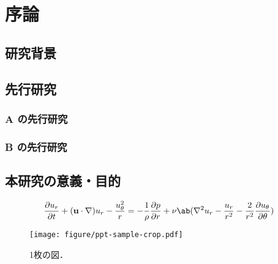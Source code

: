 
\chapter{序論}
\label{ch:introduction}


\section{研究背景}
\label{sec:background}


\section{先行研究}
\label{sec:previous}

\subsection{A の先行研究}
\label{ssec:previous_A}

\subsection{B の先行研究}
\label{ssec:previous_B}


\section{本研究の意義・目的}
\label{sec:objective}

\begin{equation}
    \pdv{u_r}{t} + (\mathbf{u}\cdot\nabla)u_r - \frac{u_\theta^2}{r} = 
    -\frac{1}{\rho}\pdv{p}{r} + \nu\ab(\nabla^2 u_r - \frac{u_r}{r^2} - \frac{2}{r^2}\pdv{u_\theta}{\theta})
    \label{eq:NSr2}
\end{equation}

\begin{figure}[tp]
    \centering
    \texttt{[image: figure/ppt-sample-crop.pdf]}
    \caption{1枚の図．}
    \label{fig:one_figure}
\end{figure}
